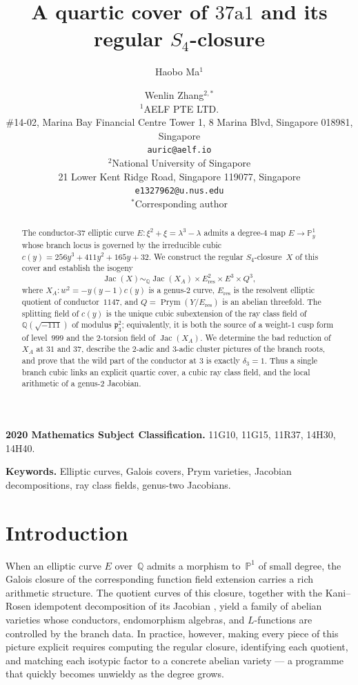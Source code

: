 \documentclass[11pt,letterpaper]{article}
\title{A quartic cover of \texorpdfstring{$37\mathrm{a}1$}{37a1} and its regular \texorpdfstring{$S_4$}{S4}-closure}
\author{%
Haobo Ma\(^{1}\) \and Wenlin Zhang\(^{2,*}\)\\[0.5em]
\small \(^{1}\)AELF PTE LTD.\\
\small \#14-02, Marina Bay Financial Centre Tower 1, 8 Marina Blvd, Singapore 018981, Singapore\\
\small \texttt{auric@aelf.io}\\
\small \(^{2}\)National University of Singapore\\
\small 21 Lower Kent Ridge Road, Singapore 119077, Singapore\\
\small \texttt{e1327962@u.nus.edu}\\
\small \(^{*}\)Corresponding author
}
\date{}
\theoremstyle{plain}
\theoremstyle{remark}
\newcommand{\QQ}{\mathbb{Q}}
\newcommand{\PP}{\mathbb{P}}
\newcommand{\Jac}{\operatorname{Jac}}
\newcommand{\Prym}{\operatorname{Prym}}
\begin{document}
\maketitle

\begin{abstract}
The conductor-\(37\) elliptic curve \(E\colon\xi^2+\xi=\lambda^3-\lambda\) admits a degree-\(4\) map \(E\to\PP^1_y\) whose branch locus is governed by the irreducible cubic \(c(y)=256y^3+411y^2+165y+32\). We construct the regular \(S_4\)-closure~\(X\) of this cover and establish the isogeny
\[
\Jac(X)\sim_{\QQ}\Jac(X_A)\times E_{\mathrm{res}}^2\times E^3\times Q^3,
\]
where \(X_A\colon w^2=-y(y-1)c(y)\) is a genus-\(2\) curve, \(E_{\mathrm{res}}\) is the resolvent elliptic quotient of conductor~\(1147\), and \(Q=\Prym(Y/E_{\mathrm{res}})\) is an abelian threefold. The splitting field of \(c(y)\) is the unique cubic subextension of the ray class field of \(\QQ(\sqrt{-111})\) of modulus \(\mathfrak p_3^2\); equivalently, it is both the source of a weight-\(1\) cusp form of level~\(999\) and the \(2\)-torsion field of \(\Jac(X_A)\). We determine the bad reduction of \(X_A\) at \(31\) and \(37\), describe the \(2\)-adic and \(3\)-adic cluster pictures of the branch roots, and prove that the wild part of the conductor at \(3\) is exactly \(\delta_3=1\). Thus a single branch cubic links an explicit quartic cover, a cubic ray class field, and the local arithmetic of a genus-\(2\) Jacobian.
\end{abstract}

\noindent\textbf{2020 Mathematics Subject Classification.}
11G10, 11G15, 11R37, 14H30, 14H40.

\noindent\textbf{Keywords.}
Elliptic curves, Galois covers, Prym varieties, Jacobian decompositions, ray class fields, genus-two Jacobians.

\section{Introduction}

When an elliptic curve \(E\) over~\(\QQ\) admits a morphism to~\(\PP^1\) of small degree, the Galois closure of the corresponding function field extension carries a rich arithmetic structure. The quotient curves of this closure, together with the Kani--Rosen idempotent decomposition of its Jacobian \cite{KaniRosen1989}, yield a family of abelian varieties whose conductors, endomorphism algebras, and \(L\)-functions are controlled by the branch data. In practice, however, making every piece of this picture explicit requires computing the regular closure, identifying each quotient, and matching each isotypic factor to a concrete abelian variety --- a programme that quickly becomes unwieldy as the degree grows.
\end{document}
